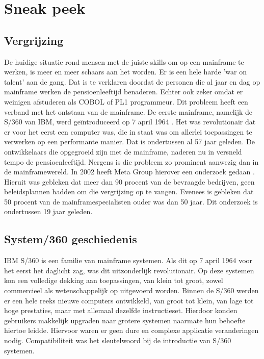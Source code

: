 
\section{Sneak peek}
\label{sec:state-of-the-art}

\subsection*{Vergrijzing} 

De huidige situatie rond mensen met de juiste skills om op een mainframe te werken, is meer en meer schaars aan het worden. Er is een hele harde 'war on talent' aan de gang. Dat is te verklaren doordat de personen die al jaar en dag op mainframe werken de pensioenleeftijd benaderen. Echter ook zeker omdat er weinigen afstuderen als COBOL of PL1 programmeur. Dit probleem heeft een verband met het ontstaan van de mainframe. De eerste mainframe, namelijk de S/360 van IBM, werd geïntroduceerd op 7 april 1964 \autocite{Elliot2005}. Het was revolutionair dat er voor het eerst een computer was, die in staat was om allerlei toepassingen te verwerken op een performante manier. Dat is ondertussen al 57 jaar geleden. De ontwikkelaars die opgegroeid zijn met de mainframe, naderen nu in versneld tempo de pensioenleeftijd. Nergens is die probleem zo prominent aanwezig dan in de mainframewereld. In 2002 heeft Meta Group hierover een onderzoek gedaan . Hieruit was gebleken dat meer dan 90 procent van de bevraagde bedrijven, geen beleidsplannen hadden om die vergrijzing op te vangen. Evenees is gebleken dat 50 procent van de mainframespecialisten ouder was dan 50 jaar. Dit onderzoek is ondertussen 19 jaar geleden.

\subsection*{System/360 geschiedenis} 

IBM S/360 is een familie van mainframe systemen. Als dit op 7 april 1964 \autocite{Elliot2005} voor het eerst het daglicht zag, was dit uitzonderlijk revolutionair. Op deze systemen kon een volledige dekking aan toepassingen, van klein tot groot, zowel commercieel als wetenschappelijk op uitgevoerd worden. Binnen de S/360 werden er een hele reeks nieuwe computers ontwikkeld, van groot tot klein, van lage tot hoge prestaties, maar met allemaal dezelfde instructieset. Hierdoor konden gebruikers makkelijk upgraden naar grotere systemen naarmate hun behoefte hiertoe leidde. Hiervoor waren er geen dure en complexe applicatie veranderingen nodig. Compatibiliteit was het sleutelwoord bij de introductie van S/360 systemen. 


